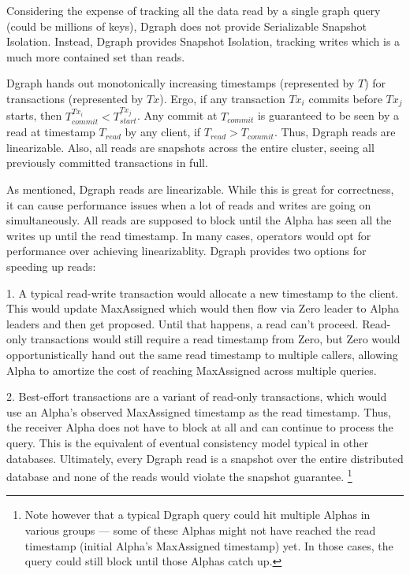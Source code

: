 \documentclass[letterpaper,twocolumn,10pt]{article}
\begin{document}
Considering the expense of tracking all the data read by a single graph query
(could be millions of keys), Dgraph does not provide Serializable Snapshot
Isolation. Instead, Dgraph provides Snapshot Isolation, tracking writes which is
a much more contained set than reads.

Dgraph hands out monotonically increasing timestamps (represented by $T$) for
transactions (represented by $Tx$). Ergo, if any transaction $Tx_i$ commits
before $Tx_j$ starts, then $T_{commit}^{Tx_i} < T_{start}^{Tx_j}$. Any commit at
$T_{commit}$ is guaranteed to be seen by a read at timestamp $T_{read}$ by any
client, if $T_{read} > T_{commit}$. Thus, Dgraph reads are linearizable. Also,
all reads are snapshots across the entire cluster, seeing all previously
committed transactions in full.

As mentioned, Dgraph reads are linearizable. While this is great for correctness,
it can cause performance issues when a lot of reads and writes are going on
simultaneously. All reads are supposed to block until the Alpha has seen all the
writes up until the read timestamp. In many cases, operators would opt
for performance over achieving linearizablity. Dgraph provides two options for
speeding up reads:

1. A typical read-write transaction would allocate a new timestamp to the
client. This would update MaxAssigned which would then flow via Zero leader to
Alpha leaders and then get proposed. Until that happens, a read can't proceed.
Read-only transactions would still require a read timestamp from Zero, but Zero
would opportunistically hand out the same read timestamp to multiple callers,
allowing Alpha to amortize the cost of reaching MaxAssigned across multiple
queries.

2. Best-effort transactions are a variant of read-only transactions, which would
use an Alpha's observed MaxAssigned timestamp as the read timestamp. Thus, the
receiver Alpha does not have to block at all and can continue to process the
query. This is the equivalent of eventual consistency model typical in other
databases. Ultimately, every Dgraph read is a snapshot over the entire
distributed database and none of the reads would violate the snapshot guarantee.
\footnote{Note however that a typical Dgraph query could hit multiple Alphas in
various groups --- some of these Alphas might not have reached the read
timestamp (initial Alpha's MaxAssigned timestamp) yet. In those cases, the query
could still block until those Alphas catch up.}
\end{document}
